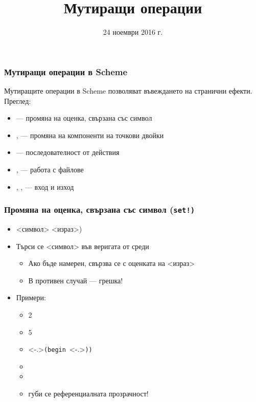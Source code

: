 \documentclass{beamer}
\title{Мутиращи операции}
\date{24 ноември 2016 г.}
\begin{document}
\begin{frame}
  \titlepage
\end{frame}

\begin{frame}
  \frametitle{Мутиращи операции в Scheme}

  Мутиращите операции в Scheme позволяват въвеждането на \alert{странични ефекти}.\\[2em]
  Преглед:
  \begin{itemize}[<+->]
  \item {} --- промяна на оценка, свързана със символ
  \item {},  --- промяна на компоненти на точкови двойки
  \item {} --- последователност от действия
  \item {},  --- работа с файлове
  \item {}, ,  --- вход и изход
  \end{itemize}
\end{frame}

\begin{frame}[fragile]
  \frametitle{Промяна на оценка, свързана със символ (\tt{set!})}

  \begin{itemize}[<+->]
  \item {}<символ> <израз>\tta)
  \item Търси се <символ> във веригата от среди
    \begin{itemize}
    \item Ако бъде намерен, свързва се с оценката на <израз>
    \item В противен случай --- \alert{грешка!}
    \end{itemize}
  \item Примери:
    \begin{itemize}
    \item {}\hspace{5ex}2
    \item {}\hspace{7ex}5
    \item {}\only<-.>{\tt{(begin }}\only<-.>{\tt)}\tt)\pause
    \item {}
    \item {}
    \item \alert{губи се референциалната прозрачност!}
    \end{itemize}
  \end{itemize}
\end{frame}
\end{document}
